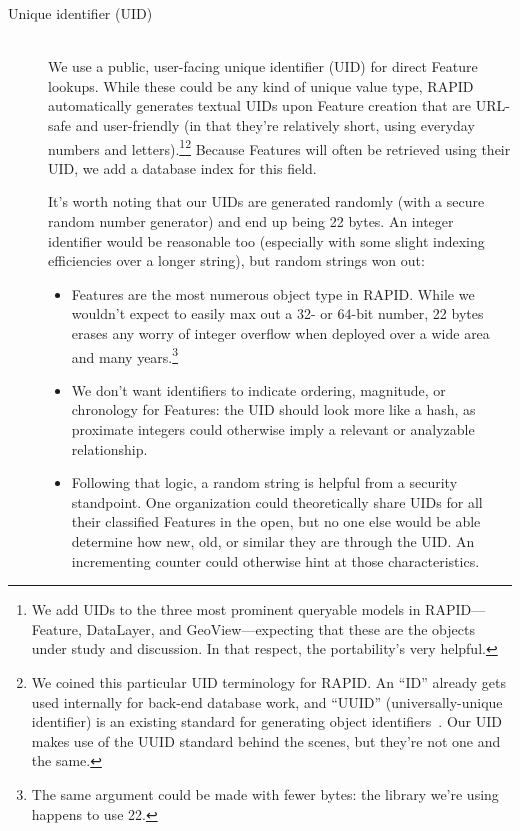 \begin{description}
  \item[Unique identifier (UID)] \hfill \\
  We use a public, user-facing unique identifier (UID) for direct Feature lookups. While these could be any kind of unique value type, RAPID automatically generates textual UIDs upon Feature creation that are URL-safe and user-friendly (in that they're relatively short, using everyday numbers and letters).\footnote{We add UIDs to the three most prominent queryable models in RAPID---Feature, DataLayer, and GeoView---expecting that these are the objects under study and discussion. In that respect, the portability's very helpful.}\footnote{We coined this particular UID terminology for RAPID. An ``ID'' already gets used internally for back-end database work, and ``UUID'' (universally-unique identifier) is an existing standard for generating object identifiers~\cite{Leach}. Our UID makes use of the UUID standard behind the scenes, but they're not one and the same.} Because Features will often be retrieved using their UID, we add a database index for this field.
  
It's worth noting that our UIDs are generated randomly (with a secure random number generator) and end up being 22 bytes. An integer identifier would be reasonable too (especially with some slight indexing efficiencies over a longer string), but random strings won out:
  
  \begin{itemize}
  \item Features are the most numerous object type in RAPID. While we wouldn't expect to easily max out a 32- or 64-bit number, 22 bytes erases any worry of integer overflow when deployed over a wide area and many years.\footnote{The same argument could be made with fewer bytes: the library we're using happens to use 22.}
  \item We don't want identifiers to indicate ordering, magnitude, or chronology for Features: the UID should look more like a hash, as proximate integers could otherwise imply a relevant or analyzable relationship.
  \item Following that logic, a random string is helpful from a security standpoint. One organization could theoretically share UIDs for all their classified Features in the open, but no one else would be able determine how new, old, or similar they are through the UID. An incrementing counter could otherwise hint at those characteristics.
\end{itemize}
  

\end{description}
